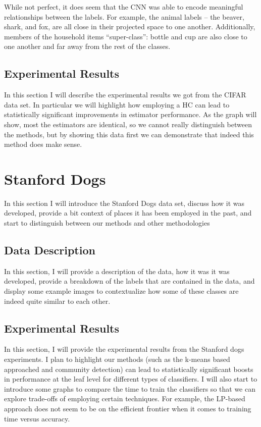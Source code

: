 \documentclass[../thesis.tex]{subfiles}
\begin{document}
While not perfect, it does seem that the CNN was able to encode meaningful relationships between the labels. For example, the animal labels -- the beaver, shark, and fox, are all close in their projected space to one another. Additionally, members of the household items ``super-class'': bottle and cup are also close to one another and far away from the rest of the classes.

\subsection{Experimental Results}
In this section I will describe the experimental results we got from the CIFAR data set. In particular we will highlight how employing a HC can lead to statistically significant improvements in estimator performance. As the graph will show, most the estimators are identical, so we cannot really distinguish between the methods, but by showing this data first we can demonstrate that indeed this method does make sense.

\section{Stanford Dogs}
In this section I will introduce the Stanford Dogs data set, discuss how it was developed, provide a bit context of places it has been employed in the past, and start to distinguish between our methods and other methodologies

\subsection{Data Description}
In this section, I will provide a description of the data, how it was it was developed, provide a breakdown of the labels that are contained in the data, and display some example images to contextualize how some of these classes are indeed quite similar to each other. 

\subsection{Experimental Results}
In this section, I will provide the experimental results from the Stanford dogs experiments. I plan to highlight our methods (such as the k-means based approached and community detection) can lead to statistically significant boosts in performance at the leaf level for different types of classifiers. I will also start to introduce some graphs to compare the time to train the classifiers so that we can explore trade-offs of employing certain techniques. For example, the LP-based approach does not seem to be on the efficient frontier when it comes to training time versus accuracy. 
\end{document}
